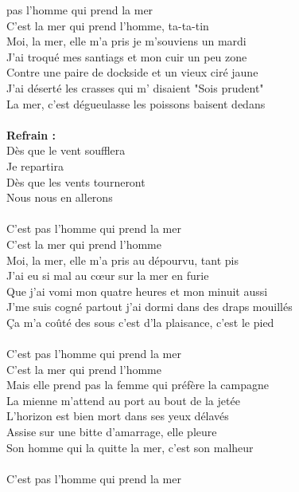
 pas l'homme qui prend la mer
\\C'est la mer qui prend l'homme, ta-ta-tin
\\Moi, la mer, elle m'a pris je m'souviens un mardi
\\J'ai troqué mes santiags et mon cuir un peu zone
\\Contre une paire de dockside et un vieux ciré jaune
\\J'ai déserté les crasses qui m' disaient "Sois prudent"
\\La mer, c'est dégueulasse les poissons baisent dedans
\\\\\textbf{Refrain :}
\\Dès que le vent soufflera
\\Je repartira
\\Dès que les vents tourneront
\\Nous nous en allerons
\\\\C'est pas l'homme qui prend la mer
\\C'est la mer qui prend l'homme
\\Moi, la mer, elle m'a pris au dépourvu, tant pis
\\J'ai eu si mal au cœur sur la mer en furie
\\Que j'ai vomi mon quatre heures et mon minuit aussi
\\J'me suis cogné partout j'ai dormi dans des draps mouillés
\\Ça m'a coûté des sous c'est d'la plaisance, c'est le pied
\\\\C'est pas l'homme qui prend la mer
\\C'est la mer qui prend l'homme
\\Mais elle prend pas la femme qui préfère la campagne
\\La mienne m'attend au port au bout de la jetée
\\L'horizon est bien mort dans ses yeux délavés
\\Assise sur une bitte d'amarrage, elle pleure
\\Son homme qui la quitte la mer, c'est son malheur
\\\\C'est pas l'homme qui prend la mer
